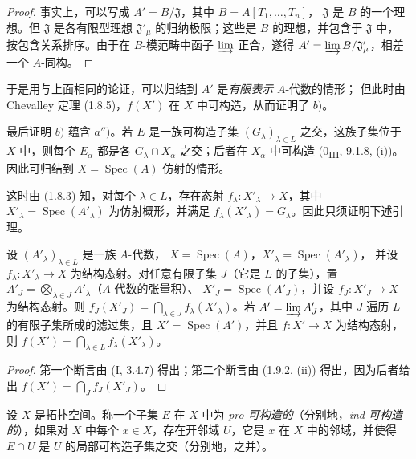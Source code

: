 \begin{proof}
事实上，可以写成 $A'=B/\mathfrak J$，其中 $B=A[T_1,\ldots,T_n]$，
$\mathfrak J$ 是 $B$ 的一个理想。但 $\mathfrak J$ 是各有限型理想
$\mathfrak J'_\mu$ 的归纳极限；这些是 $B$ 的理想，并包含于 $\mathfrak J$ 中，
按包含关系排序。由于在 $B$-模范畴中函子 $\varinjlim$ 正合，遂得
$A'=\varinjlim B/\mathfrak J'_\mu$，相差一个 $A$-同构。
\end{proof}

于是用与上面相同的论证，可以归结到 $A'$ 是\emph{有限表示} $A$-代数的情形；
但此时由 Chevalley 定理 (1.8.5)，$f(X')$ 在 $X$ 中可构造，从而证明了
$b)$。

最后证明 $b)$ 蕴含 $a'')$。若 $E$ 是一族可构造子集
$(G_\lambda)_{\lambda\in L}$ 之交，这族子集位于 $X$ 中，则每个 $E_\alpha$ 都是各
$G_\lambda\cap X_\alpha$ 之交；后者在 $X_\alpha$ 中可构造
(0\textsubscript{III}, 9.1.8, (i))。因此可归结到
$X=\operatorname{Spec}(A)$ 仿射的情形。

这时由 (1.8.3) 知，对每个 $\lambda\in L$，存在态射
$f_\lambda:X'_\lambda\to X$，其中
$X'_\lambda=\operatorname{Spec}(A'_\lambda)$ 为仿射概形，并满足
$f_\lambda(X'_\lambda)=G_\lambda$。因此只须证明下述引理。

\begin{lemma}[1.9.3.2]
\label{IV.1.9.3.2-fr}
设 $(A'_\lambda)_{\lambda\in L}$ 是一族 $A$-代数，
$X=\operatorname{Spec}(A)$，$X'_\lambda=\operatorname{Spec}(A'_\lambda)$，
并设 $f_\lambda:X'_\lambda\to X$ 为结构态射。对任意有限子集
$J$（它是 $L$ 的子集），置 $A'_J=\bigotimes_{\lambda\in J}A'_\lambda$（$A$-代数的张量积）、
$X'_J=\operatorname{Spec}(A'_J)$，并设 $f_J:X'_J\to X$ 为结构态射。则
$f_J(X'_J)=\bigcap_{\lambda\in J}f_\lambda(X'_\lambda)$。若
$A'=\varinjlim A'_J$，其中 $J$ 遍历 $L$ 的有限子集所成的滤过集，且
$X'=\operatorname{Spec}(A')$，并且 $f:X'\to X$ 为结构态射，则
$f(X')=\bigcap_{\lambda\in L}f_\lambda(X'_\lambda)$。
\end{lemma}

\begin{proof}
第一个断言由 (I, 3.4.7) 得出；第二个断言由 (1.9.2, (ii)) 得出，因为后者给出
$f(X')=\bigcap_Jf_J(X'_J)$。
\end{proof}

\begin{definition}[1.9.4]
\label{IV.1.9.4-fr}
设 $X$ 是拓扑空间。称一个子集 $E$ 在 $X$ 中为
\emph{pro-可构造的}（分别地，\emph{ind-可构造的}），如果对 $X$ 中每个
$x\in X$，存在开邻域 $U$，它是 $x$ 在 $X$ 中的邻域，并使得
$E\cap U$ 是 $U$ 的局部可构造子集之交（分别地，之并）。
\end{definition}

